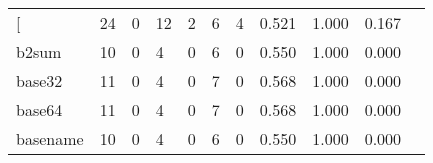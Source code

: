 \begin{longtable}{lp{1.2cm}p{1.2cm}p{1.2cm}p{1.2cm}p{1.2cm}p{1.2cm}p{1.2cm}p{1.2cm}p{1.2cm}p{1.2cm}}
\bottomrule
\endlastfoot
{[}         &                                    24 &                                                  0 &                                                 12 &                                                  2 &                                                  6 &                                                  4 &                                              0.521 &                                              1.000 &                                              0.167 \\
b2sum     &                                    10 &                                                  0 &                                                  4 &                                                  0 &                                                  6 &                                                  0 &                                              0.550 &                                              1.000 &                                              0.000 \\
base32    &                                    11 &                                                  0 &                                                  4 &                                                  0 &                                                  7 &                                                  0 &                                              0.568 &                                              1.000 &                                              0.000 \\
base64    &                                    11 &                                                  0 &                                                  4 &                                                  0 &                                                  7 &                                                  0 &                                              0.568 &                                              1.000 &                                              0.000 \\
basename  &                                    10 &                                                  0 &                                                  4 &                                                  0 &                                                  6 &                                                  0 &                                              0.550 &                                              1.000 &                                              0.000 \\

\end{longtable}

